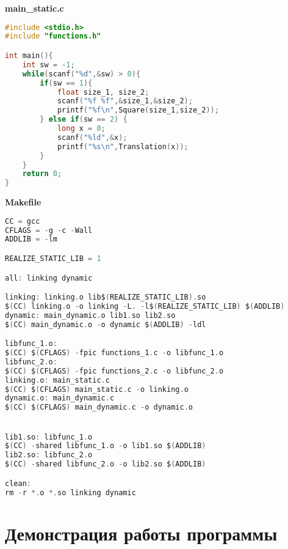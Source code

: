 \documentclass[pdf, unicode, 12pt, a4paper,oneside,fleqn]{article}
\begin{document}
{\large\textbf{main\_static.c}}

\begin{lstlisting}[language=C]
#include <stdio.h>
#include "functions.h"

int main(){
    int sw = -1;
    while(scanf("%d",&sw) > 0){
        if(sw == 1){
            float size_1, size_2;
            scanf("%f %f",&size_1,&size_2);
            printf("%f\n",Square(size_1,size_2));
        } else if(sw == 2) {
            long x = 0;
            scanf("%ld",&x);
            printf("%s\n",Translation(x));
        }
    }
    return 0;
}
\end{lstlisting}

{\large\textbf{Makefile}}

\begin{lstlisting}[language=C]
CC = gcc
CFLAGS = -g -c -Wall
ADDLIB = -lm

REALIZE_STATIC_LIB = 1

all: linking dynamic 

linking: linking.o lib$(REALIZE_STATIC_LIB).so 
$(CC) linking.o -o linking -L. -l$(REALIZE_STATIC_LIB) $(ADDLIB)
dynamic: main_dynamic.o lib1.so lib2.so
$(CC) main_dynamic.o -o dynamic $(ADDLIB) -ldl

libfunc_1.o:
$(CC) $(CFLAGS) -fpic functions_1.c -o libfunc_1.o 
libfunc_2.o:
$(CC) $(CFLAGS) -fpic functions_2.c -o libfunc_2.o
linking.o: main_static.c
$(CC) $(CFLAGS) main_static.c -o linking.o
dynamic.o: main_dynamic.c 
$(CC) $(CFLAGS) main_dynamic.c -o dynamic.o


lib1.so: libfunc_1.o
$(CC) -shared libfunc_1.o -o lib1.so $(ADDLIB)
lib2.so: libfunc_2.o
$(CC) -shared libfunc_2.o -o lib2.so $(ADDLIB)

clean:
rm -r *.o *.so linking dynamic
\end{lstlisting}

\pagebreak

\section{Демонстрация работы программы}
\end{document}
